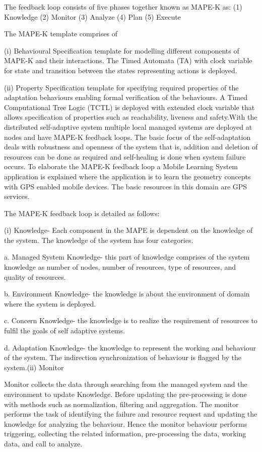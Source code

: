 \begin{compactitem}
The feedback loop consists of five phases together known as MAPE-K as: (1) Knowledge (2) Monitor (3) Analyze (4) Plan (5) Execute

The MAPE-K template comprises of

(i) Behavioural Specification template for modelling different components of MAPE-K and their interactions. The Timed Automata (TA) with clock variable for state and transition between the states representing actions is deployed.

(ii) Property Specification template for specifying required properties of the adaptation behaviours enabling formal verification of the behaviours. A Timed Computational Tree Logic (TCTL) is deployed with extended clock variable that allows specification of properties such as reachability, liveness and safety.With the distributed self-adaptive system multiple local managed systems are deployed at nodes and have MAPE-K feedback loops. The basic focus of the self-adaptation deals with robustness and openness of the system that is, addition and deletion of resources can be done as required and self-healing is done when system failure occurs. To elaborate the MAPE-K feedback loop a Mobile Learning System application is explained where the application is to learn the geometry concepts with GPS enabled mobile devices. The basic resources in this domain are GPS services.

The MAPE-K feedback loop is detailed as follows:

(i) Knowledge- Each component in the MAPE is dependent on the knowledge of the system. The knowledge of the system has four categories. 

a. Managed System Knowledge- this part of knowledge comprises of the system knowledge as number of nodes, number of resources, type of resources, and quality of resources. 

b. Environment Knowledge- the knowledge is about the environment of domain where the system is deployed.

c. Concern Knowledge- the knowledge is to realize the requirement of resources to fulfil the goals of self adaptive systems.

d. Adaptation Knowledge- the knowledge to represent the working and behaviour of the system. The indirection synchronization of behaviour is flagged by the system.(ii) Monitor

Monitor collects the data through searching from the managed system and the environment to update Knowledge. Before updating the pre-processing is done with methods such as normalization, filtering and aggregation. The monitor performs the task of identifying the failure and resource request and updating the knowledge for analyzing 
the behaviour. Hence the monitor behaviour performs triggering, collecting the related information, pre-processing the data, working data, and call to analyze.


\end{compactitem}
